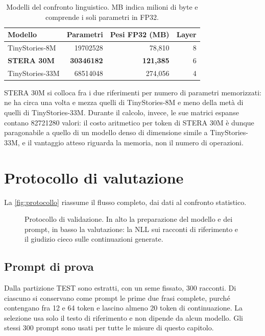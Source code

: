\begin{table}[htbp]
\centering
\small
\begin{tabularx}{\linewidth}{Xrrr}
\toprule
Modello & Parametri & Pesi FP32 (MB) & Layer \\
\midrule
TinyStories-8M & \num{19702528} & 78,810 & 8 \\
\textbf{STERA 30M} & \textbf{\num{30346182}} & \textbf{121,385} & 6 \\
TinyStories-33M & \num{68514048} & 274,056 & 4 \\
\bottomrule
\end{tabularx}
\caption{Modelli del confronto linguistico. MB indica milioni di byte e comprende i soli parametri in FP32.}
\label{tab:modelli-principali}
\end{table}

STERA 30M si colloca fra i due riferimenti per numero di parametri memorizzati: ne ha circa una volta e mezza quelli di TinyStories-8M e meno della metà di quelli di TinyStories-33M. Durante il calcolo, invece, le sue matrici espanse contano \num{82721280} valori: il costo aritmetico per token di STERA 30M è dunque paragonabile a quello di un modello denso di dimensione simile a TinyStories-33M, e il vantaggio atteso riguarda la memoria, non il numero di operazioni.

\section{Protocollo di valutazione}
\label{sec:metodo-confronto-generativo}

La \autoref{fig:protocollo} riassume il flusso completo, dai dati al confronto statistico.

\begin{figure}[htbp]
\centering
\resizebox{\linewidth}{!}{}
\caption{Protocollo di validazione. In alto la preparazione del modello e dei prompt, in basso la valutazione: la NLL sui racconti di riferimento e il giudizio cieco sulle continuazioni generate.}
\label{fig:protocollo}
\end{figure}

\subsection{Prompt di prova}

Dalla partizione TEST sono estratti, con un seme fissato, 300 racconti. Di ciascuno si conservano come prompt le prime due frasi complete, purché contengano fra 12 e 64 token e lascino almeno 20 token di continuazione. La selezione usa solo il testo di riferimento e non dipende da alcun modello. Gli stessi 300 prompt sono usati per tutte le misure di questo capitolo.

